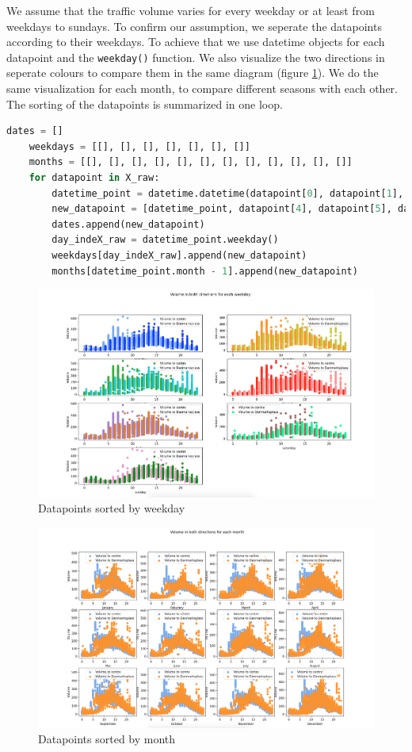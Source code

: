 \documentclass[12pt,a4paper]{scrartcl}		%
\begin{document}
We assume that the traffic volume varies for every weekday or at least from weekdays to sundays. To confirm our assumption, we seperate 
the datapoints according to their weekdays. To achieve that we use datetime objects for each datapoint and the \texttt{weekday()} function.
We also visualize the two directions in seperate colours to compare them in the same diagram (figure \ref{fig::days}).
We do the same visualization for each month, to compare different seasons with each other.
The sorting of the datapoints is summarized in one loop.
\begin{lstlisting}[language=Python]
    dates = []
    weekdays = [[], [], [], [], [], [], []]
    months = [[], [], [], [], [], [], [], [], [], [], [], []]
    for datapoint in X_raw:
        datetime_point = datetime.datetime(datapoint[0], datapoint[1], datapoint[2], hour = datapoint[3])
        new_datapoint = [datetime_point, datapoint[4], datapoint[5], datapoint[6]]
        dates.append(new_datapoint)
        day_indeX_raw = datetime_point.weekday()
        weekdays[day_indeX_raw].append(new_datapoint)
        months[datetime_point.month - 1].append(new_datapoint)
\end{lstlisting}

\begin{figure}[h]
    \centering
    \includegraphics[scale = 0.29]{vis_days.png}
    \caption{Datapoints sorted by weekday}
    \label{fig::days}
\end{figure}

\begin{figure}[h]
    \centering
    \includegraphics[scale = 0.28]{vis_months.png}
    \caption{Datapoints sorted by month}
    \label{fig::month}
\end{figure}
\end{document}
